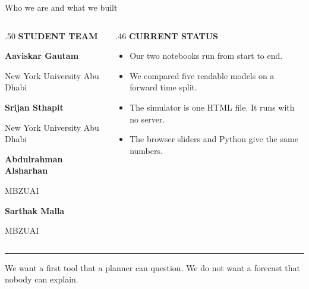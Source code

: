 \documentclass[aspectratio=169,10pt]{beamer}
\newcommand{\MemberOne}{Aaviskar Gautam}
\newcommand{\MemberTwo}{Srijan Sthapit}
\newcommand{\MemberThree}{Abdulrahman Alsharhan}
\newcommand{\MemberFour}{Sarthak Malla}
\newcommand{\kicker}[1]{{\color{Accent}\scriptsize\bfseries\MakeUppercase{#1}}\par\vspace{.16cm}}
\newcommand{\smallnote}[1]{{\color{Muted}\scriptsize #1}}
\newcommand{\strong}[1]{{\bfseries #1}}
\begin{document}
\begin{frame}{Who we are and what we built}
  \begin{columns}[T,totalwidth=\linewidth]
    \begin{column}{.50\linewidth}
      \kicker{Student team}
      \strong{\MemberOne}\par{\color{Muted}\small New York University Abu Dhabi}\par\vspace{.22cm}
      \strong{\MemberTwo}\par{\color{Muted}\small New York University Abu Dhabi}\par\vspace{.22cm}
      \strong{\MemberThree}\par{\color{Muted}\small MBZUAI}\par\vspace{.22cm}
      \strong{\MemberFour}\par{\color{Muted}\small MBZUAI}
    \end{column}
    \begin{column}{.46\linewidth}
      \kicker{Current status}
      \begin{itemize}\setlength\itemsep{.27cm}
        \item Our two notebooks run from start to end.
        \item We compared five readable models on a forward time split.
        \item The simulator is one HTML file. It runs with no server.
        \item The browser sliders and Python give the same numbers.
      \end{itemize}
    \end{column}
  \end{columns}
  \vfill
  {\color{Rule}\rule{\linewidth}{.5pt}}\par
  \smallnote{We want a first tool that a planner can question. We do not want a forecast that nobody can explain.}
\end{frame}
\end{document}
